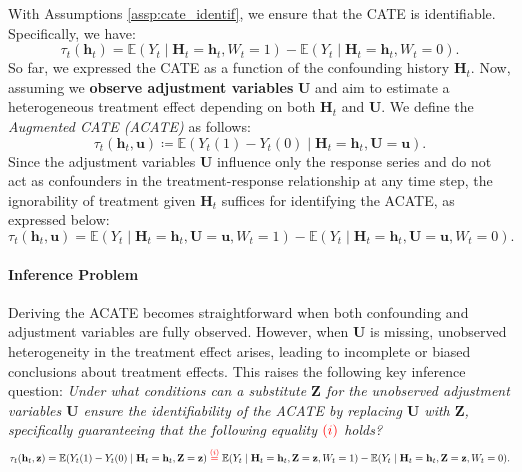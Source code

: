 \documentclass[10pt]{article} %
\begin{document}
With Assumptions \ref{assp:cate_identif}, we ensure that the CATE is identifiable. Specifically, we have:
\begin{equation}
\label{eq:CATE_Identifiability}
\tau_t(\mathbf{h}_{t}) = \mathbb{E}(Y_{t} \mid \mathbf{H}_t = \mathbf{h}_t, W_{t} = 1) - \mathbb{E}(Y_{t} \mid \mathbf{H}_t = \mathbf{h}_t, W_{t} = 0).
\end{equation}
So far, we expressed the CATE as a function of the confounding history \(\mathbf{H}_t\). Now, assuming we \textbf{observe adjustment variables} $\mathbf{U}$ and aim to estimate a heterogeneous treatment effect depending on both $\mathbf{H}_{t}$ and $\mathbf{U}$. We define the \emph{Augmented CATE (ACATE)} as follows:
\begin{equation}
\label{eq:def_acate}
\tau_{t}(\mathbf{h}_{t}, \mathbf{u}) \coloneqq \mathbb{E}(Y_t(1) - Y_t(0) \mid \mathbf{H}_{t} = \mathbf{h}_{t}, \mathbf{U} = \mathbf{u}).
\end{equation}
Since the adjustment variables $\mathbf{U}$ influence only the response series and do not act as confounders in the treatment-response relationship at any time step, the ignorability of treatment given \(\mathbf{H}_t\) suffices for identifying the ACATE, as expressed below:
\begin{equation}
\label{eq:ACATE_identif_U}
\tau_{t}(\mathbf{h}_{t}, \mathbf{u}) = \mathbb{E}(Y_{t} \mid \mathbf{H}_t = \mathbf{h}_t, \mathbf{U} = \mathbf{u}, W_{t} = 1) - \mathbb{E}(Y_{t} \mid \mathbf{H}_t = \mathbf{h}_t, \mathbf{U} = \mathbf{u}, W_{t} = 0).
\end{equation}

\begin{intuitionbox}
\paragraph{Inference Problem}  
Deriving the ACATE becomes straightforward when both confounding and adjustment variables are fully observed. However, when \( \mathbf{U} \) is missing, unobserved heterogeneity in the treatment effect arises, leading to incomplete or biased conclusions about treatment effects. This raises the following key inference question: \textit{Under what conditions can a substitute \( \mathbf{Z} \) for the unobserved adjustment variables \( \mathbf{U} \) ensure the identifiability of the ACATE by replacing \( \mathbf{U} \) with \( \mathbf{Z} \), specifically guaranteeing that the following equality \( \color{red}{(i)} \) holds?}  
\begin{equation*}
\scalebox{0.9}{$
\tau_{t}(\mathbf{h}_{t}, \mathbf{z}) = \mathbb{E}(Y_t(1) - Y_t(0) \mid \mathbf{H}_{t} = \mathbf{h}_{t}, \mathbf{Z} =  \mathbf{z}) 
\overset{\color{red}{(i)}}{=}  \mathbb{E}(Y_{t} \mid \mathbf{H}_t = \mathbf{h}_t, \mathbf{Z} = \mathbf{z}, W_{t} = 1) 
- \mathbb{E}(Y_{t} \mid \mathbf{H}_t = \mathbf{h}_t, \mathbf{Z} = \mathbf{z}, W_{t} = 0).
$}
\end{equation*}
\end{intuitionbox}
\end{document}
